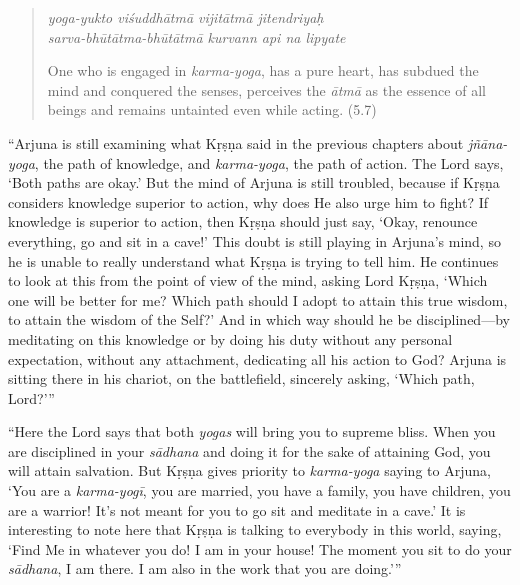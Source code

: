 \documentclass[12pt, twoside, openright]{memoir}
\begin{document}
\par
\begin{verse}
\textit{yoga-yukto viśuddhātmā vijitātmā jitendriyaḥ} \\
\textit{sarva-bhūtātma-bhūtātmā kurvann api na lipyate}

\noindent One who is engaged in \textit{karma-yoga}, has a pure heart, has subdued the mind and conquered the senses, perceives the \textit{ātmā} as the essence of all beings and remains untainted even while acting. (5.7)
\end{verse}
\par


\enquote{Arjuna is still examining what Kṛṣṇa said in the previous chapters about \textit{jñāna-yoga}, the path of knowledge, and \textit{karma-yoga}, the path of action. The Lord says, \enquote{Both paths are okay.} But the mind of Arjuna is still troubled, because if Kṛṣṇa considers knowledge superior to action, why does He also urge him to fight? If knowledge is superior to action, then Kṛṣṇa should just say, \enquote{Okay, renounce everything, go and sit in a cave!} This doubt is still playing in Arjuna’s mind, so he is unable to really understand what Kṛṣṇa is trying to tell him. He continues to look at this from the point of view of the mind, asking Lord Kṛṣṇa, \enquote{Which one will be better for me? Which path should I adopt to attain this true wisdom, to attain the wisdom of the Self?} And in which way should he be disciplined---by meditating on this knowledge or by doing his duty without any personal expectation, without any attachment, dedicating all his action to God? Arjuna is sitting there in his chariot, on the battlefield, sincerely asking, \enquote{Which path, Lord?}}

\enquote{Here the Lord says that both \textit{yogas} will bring you to supreme bliss. When you are disciplined in your \textit{sādhana} and doing it for the sake of attaining God, you will attain salvation. But Kṛṣṇa gives priority to \textit{karma-yoga} saying to Arjuna, \enquote{You are a \textit{karma-yogī}, you are married, you have a family, you have children, you are a warrior! It’s not meant for you to go sit and meditate in a cave.} It is interesting to note here that Kṛṣṇa is talking to everybody in this world, saying, \enquote{Find Me in whatever you do! I am in your house! The moment you sit to do your \textit{sādhana}, I am there. I am also in the work that you are doing.}}
\end{document}
